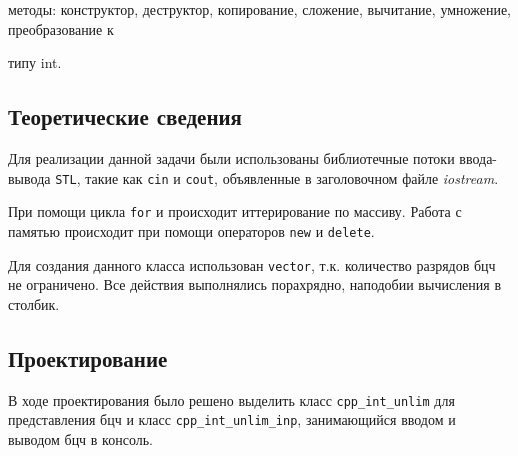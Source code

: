 \documentclass[12pt,a4paper]{report}
\begin{document}
методы: конструктор, деструктор, копирование, сложение, вычитание, умножение, преобразование к 

типу int. 

\subsection{Теоретические сведения}
\hspace{\parindent}Для реализации данной задачи были использованы библиотечные потоки ввода-вывода \verb+STL+, такие как \verb+cin+ и \verb+cout+, объявленные в заголовочном файле \textit{iostream}.

При помощи цикла \verb+for+ и происходит иттерирование по массиву. Работа с памятью происходит при помощи операторов \verb+new+ и \verb+delete+.

Для создания данного класса использован \verb+vector+, т.к. количество разрядов бцч не ограничено. Все действия выполнялись порахрядно, наподобии вычисления в столбик.

\subsection{Проектирование}
\hspace{\parindent}В ходе проектирования было решено выделить класс \verb+cpp_int_unlim+ 
для представления бцч и класс \verb+cpp_int_unlim_inp+, занимающийся вводом и выводом бцч в консоль.
\end{document}
